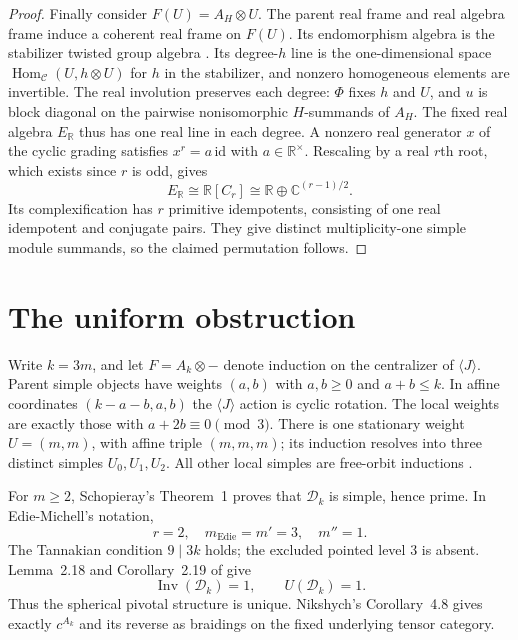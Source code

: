 \documentclass[11pt]{amsart}
\theoremstyle{remark}
\newcommand{\C}{\mathbb C}
\newcommand{\R}{\mathbb R}
\newcommand{\D}{\mathcal D}
\newcommand{\Inv}{\operatorname{Inv}}
\newcommand{\Hom}{\operatorname{Hom}}
\begin{document}
\begin{proof}
Finally consider $F(U)=A_H\otimes U$. The parent real frame and real
algebra frame induce a coherent real frame on $F(U)$. Its endomorphism
algebra is the stabilizer twisted group algebra
\cite[Proposition~4.7]{FRS}. Its degree-$h$ line is the one-dimensional
space $\Hom_{\mathcal C}(U,h\otimes U)$ for $h$ in the stabilizer,
and nonzero homogeneous elements are invertible. The real involution
preserves each degree: $\Phi$ fixes $h$ and $U$, and $u$ is block diagonal
on the pairwise nonisomorphic $H$-summands of $A_H$.
The fixed real algebra $E_\R$ thus has one real line in each degree.
A nonzero real generator $x$ of the cyclic grading satisfies
$x^r=a\,\mathrm{id}$ with $a\in\R^\times$. Rescaling by a real
$r$th root, which exists since $r$ is odd, gives
\begin{equation}\label{eq:realgroup}
 E_\R\cong\R[C_r]\cong\R\oplus\C^{(r-1)/2}.
\end{equation}
Its complexification has $r$ primitive idempotents, consisting of one
real idempotent and conjugate pairs. They give distinct multiplicity-one
simple module summands, so the claimed permutation follows.
\end{proof}


\section{The uniform obstruction}\label{sec:family}

Write $k=3m$, and let $F=A_k\otimes-$ denote induction on the
centralizer of $\langle J\rangle$. Parent simple objects have weights $(a,b)$ with
$a,b\ge0$ and $a+b\le k$. In affine coordinates $(k-a-b,a,b)$ the
$\langle J\rangle$ action is cyclic rotation. The local weights are
exactly those with $a+2b\equiv0\pmod3$. There is one stationary
weight $U=(m,m)$, with affine triple $(m,m,m)$; its induction resolves
into three distinct simples $U_0,U_1,U_2$. All other local simples are
free-orbit inductions \cite[Section~2.2]{Edie}.

For $m\ge2$, Schopieray's Theorem~1 \cite{Schopieray} proves that
$\D_k$ is simple, hence prime. In Edie-Michell's notation,
\[
 r=2,\quad m_{\mathrm{Edie}}=m'=3,\quad m''=1.
\]
The Tannakian condition $9\mid3k$ holds; the excluded pointed level
$3$ is absent. Lemma~2.18 and Corollary~2.19 of \cite{Edie} give
\begin{equation}\label{eq:grading}
 \Inv(\D_k)=1,\qquad U(\D_k)=1.
\end{equation}
Thus the spherical pivotal structure is unique. Nikshych's
Corollary~4.8 gives exactly $c^{A_k}$ and its reverse as braidings on
the fixed underlying tensor category.
\end{document}
